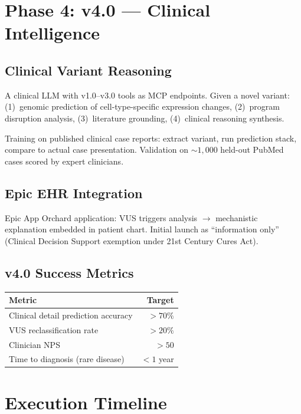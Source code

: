 \documentclass[10pt,twocolumn,letterpaper]{article}
\begin{document}
\section{Phase 4: v4.0 --- Clinical Intelligence}

\subsection{Clinical Variant Reasoning}

A clinical LLM with v1.0--v3.0 tools as MCP endpoints. Given a novel variant:
(1)~genomic prediction of cell-type-specific expression changes,
(2)~program disruption analysis, (3)~literature grounding, (4)~clinical
reasoning synthesis.

Training on published clinical case reports: extract variant, run prediction
stack, compare to actual case presentation. Validation on ${\sim}1{,}000$
held-out PubMed cases scored by expert clinicians.

\subsection{Epic EHR Integration}

Epic App Orchard application: VUS triggers analysis $\to$ mechanistic
explanation embedded in patient chart. Initial launch as ``information only''
(Clinical Decision Support exemption under 21st Century Cures Act).

\subsection{v4.0 Success Metrics}

\begin{table}[h]
\centering\small
\begin{tabular}{@{}lr@{}}
\toprule
Metric & Target \\
\midrule
Clinical detail prediction accuracy & ${>}70\%$ \\
VUS reclassification rate & ${>}20\%$ \\
Clinician NPS & ${>}50$ \\
Time to diagnosis (rare disease) & ${<}1$ year \\
\bottomrule
\end{tabular}
\end{table}

\section{Execution Timeline}
\end{document}
